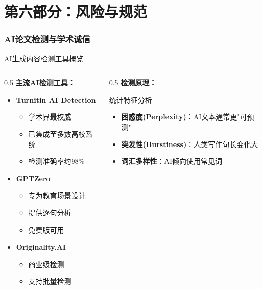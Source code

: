 \documentclass[aspectratio=169,11pt]{beamer}
\begin{document}
\part{第六部分：风险与规范}

\section{AI论文检测与学术诚信}

\begin{frame}{AI生成内容检测工具概览}
    \begin{columns}
        \begin{column}{0.5\textwidth}
            \textbf{主流AI检测工具：}
            \begin{itemize}
                \item \textbf{Turnitin AI Detection}
                    \begin{itemize}
                        \item 学术界最权威
                        \item 已集成至多数高校系统
                        \item 检测准确率约98\%
                    \end{itemize}
                \item \textbf{GPTZero}
                    \begin{itemize}
                        \item 专为教育场景设计
                        \item 提供逐句分析
                        \item 免费版可用
                    \end{itemize}
                \item \textbf{Originality.AI}
                    \begin{itemize}
                        \item 商业级检测
                        \item 支持批量检测
                    \end{itemize}
            \end{itemize}
        \end{column}
        \begin{column}{0.5\textwidth}
            \textbf{检测原理：}
            \begin{block}{统计特征分析}
                \small
                \begin{itemize}
                    \item \textbf{困惑度(Perplexity)}：AI文本通常更"可预测"
                    \item \textbf{突发性(Burstiness)}：人类写作句长变化大
                    \item \textbf{词汇多样性}：AI倾向使用常见词
                \end{itemize}
            \end{block}
            

\end{column}
\end{columns}
\end{frame}
\end{document}
